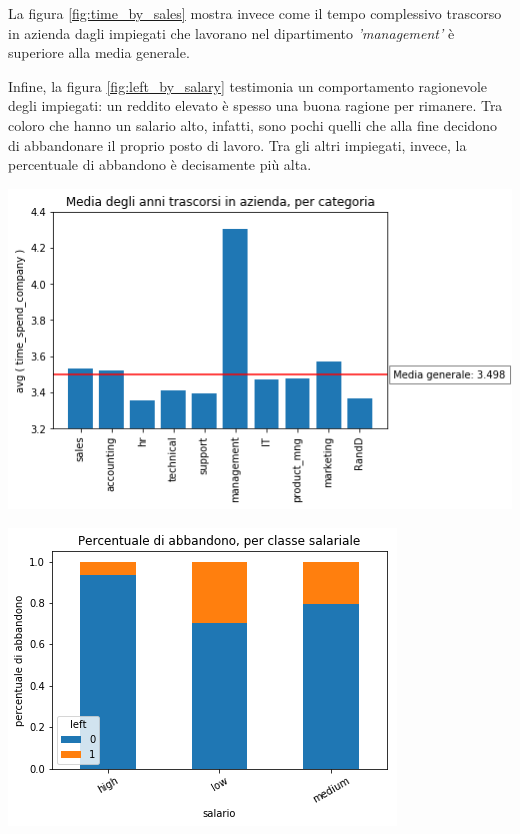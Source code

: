 \documentclass[a4paper]{article}
\begin{document}
\noindent
La figura \ref{fig:time_by_sales} mostra invece come il tempo complessivo trascorso in azienda dagli impiegati che lavorano nel dipartimento \textit{'management'} è superiore alla media generale.

Infine, la figura \ref{fig:left_by_salary} testimonia un comportamento ragionevole degli impiegati: un reddito elevato è spesso una buona ragione per rimanere. Tra coloro che hanno un salario alto, infatti, sono pochi quelli che alla fine decidono di abbandonare il proprio posto di lavoro. Tra gli altri impiegati, invece, la percentuale di abbandono è decisamente più alta.


\noindent \begin{minipage}{\textwidth}

  \begin{minipage}[b]{0.50\textwidth}
    \centering

    \includegraphics[width=\textwidth]{time_spent_by_sales}
    \label{fig:time_by_sales}
  \end{minipage}
  \hfill
  \begin{minipage}[b]{0.45\textwidth}
    \centering

    \includegraphics[width=\textwidth]{left_by_salary}
        \label{fig:left_by_salary}
  \end{minipage}
  \end{minipage}
\end{document}
